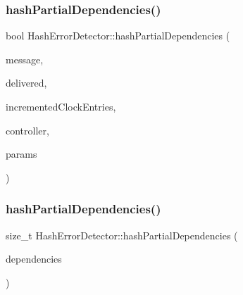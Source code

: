 \subsubsection{\texorpdfstring{hash\+Partial\+Dependencies()}{hashPartialDependencies()}\hspace{0.1cm}{\footnotesize\ttfamily [1/2]}}
{\footnotesize\ttfamily bool Hash\+Error\+Detector\+::hash\+Partial\+Dependencies (\begin{DoxyParamCaption}\item[{const \hyperlink{structures_8h_a7e7bdc1d2fff8a9436f2f352b2711ed6}{message\+Info} \&}]{message,  }\item[{const vector$<$ \hyperlink{structures_8h_a7e7bdc1d2fff8a9436f2f352b2711ed6}{message\+Info} $>$ \&}]{delivered,  }\item[{const vector$<$ unsigned int $>$ \&}]{incremented\+Clock\+Entries,  }\item[{\hyperlink{classController}{Controller} $\ast$}]{controller,  }\item[{\hyperlink{classSimulationParameters}{Simulation\+Parameters} $\ast$}]{params }\end{DoxyParamCaption})}

\mbox{\label{classHashErrorDetector_aed8b0c6d17198a493e5b89f69c2e8713}} 
\subsubsection{\texorpdfstring{hash\+Partial\+Dependencies()}{hashPartialDependencies()}\hspace{0.1cm}{\footnotesize\ttfamily [2/2]}}
{\footnotesize\ttfamily size\+\_\+t Hash\+Error\+Detector\+::hash\+Partial\+Dependencies (\begin{DoxyParamCaption}\item[{const \hyperlink{classPartialDependencies}{Partial\+Dependencies} \&}]{dependencies }\end{DoxyParamCaption})}

\mbox{\label{classHashErrorDetector_a13dd5fae3ca4898bd91d1801beed24a4}} 

